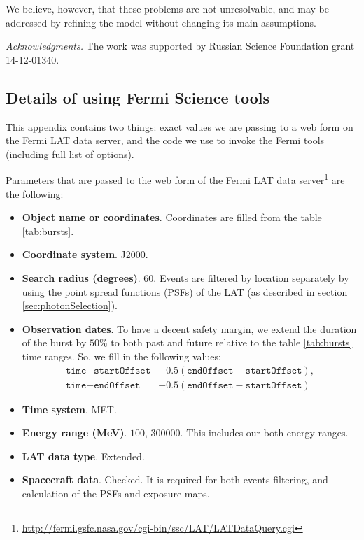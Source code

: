 \documentclass{article}
\begin{document}
	We believe, however, that these problems are not unresolvable, and may be addressed by refining the model without changing its main assumptions.

	{\small {\it Acknowledgments.} The work was supported by Russian Science Foundation grant 14-12-01340.}

\begin{appendices}

\section{Details of using Fermi Science tools}
\label{sec:fermiCode}
This appendix contains two things: exact values we are passing to a web form on the Fermi LAT data server, and the code we use to invoke the Fermi tools (including full list of options).

Parameters that are passed to the web form of the Fermi LAT data server\footnote{\url{http://fermi.gsfc.nasa.gov/cgi-bin/ssc/LAT/LATDataQuery.cgi}} are the following:
\begin{itemize}
	\item{
		{\bf Object name or coordinates}.
		Coordinates are filled from the table \ref{tab:bursts}.
	}
	\item{
		{\bf Coordinate system}.
		J2000.
	}
	\item{
		{\bf Search radius (degrees)}.
		$60$.
		Events are filtered by location separately by using the point spread functions (PSFs) of the LAT (as described in section \ref{sec:photonSelection}).
	}
	\item{
		{\bf Observation dates}.
		To have a decent safety margin, we extend the duration of the burst by $50\%$ to both past and future relative to the table \ref{tab:bursts} time ranges.
		So, we fill in the following values:
		\begin{align*}
			\texttt{time} + \texttt{startOffset} &- 0.5\left(\texttt{endOffset}-\texttt{startOffset}\right),\\
			\texttt{time} + \texttt{endOffset} &+ 0.5\left(\texttt{endOffset}-\texttt{startOffset}\right)
		\end{align*}
	}
	\item{
		{\bf Time system}.
		MET.
	}
	\item{
		{\bf Energy range (MeV)}.
		$100,\,300000$.
		This includes our both energy ranges.
	}
	\item{
		{\bf LAT data type}.
		Extended.
	}
	\item{
		{\bf Spacecraft data}.
		Checked.
		It is required for both events filtering, and calculation of the PSFs and exposure maps.
	}
\end{itemize}


\end{appendices}
\end{document}
